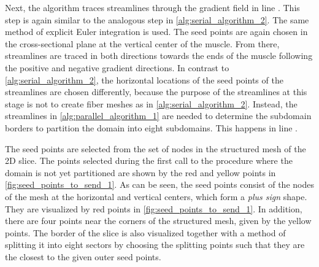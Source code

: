 Next, the algorithm traces streamlines through the gradient field in line . This step is again similar to the analogous step in \cref{alg:serial_algorithm_2}. 
The same method of explicit Euler integration is used. 
The seed points are again chosen in the cross-sectional plane at the vertical center of the muscle. 
From there, streamlines are traced in both directions towards the ends of the muscle following the positive and negative gradient directions. In contrast to \cref{alg:serial_algorithm_2}, the horizontal locations of the seed points of the streamlines are chosen differently, because the purpose of the streamlines at this stage is not to create fiber meshes as in \cref{alg:serial_algorithm_2}.
Instead, the streamlines in \cref{alg:parallel_algorithm_1} are needed to determine the subdomain borders to partition the domain into eight subdomains. This happens in line .

The seed points are selected from the set of nodes in the structured mesh of the 2D slice. The points selected during the first call to the procedure where the domain is not yet partitioned are shown by the red and yellow points in \cref{fig:seed_points_to_send_1}.
As can be seen, the seed points consist of the nodes of the mesh at the horizontal and vertical centers, which form a \emph{plus sign} shape. They are visualized by red points in \cref{fig:seed_points_to_send_1}.
In addition, there are four points near the corners of the structured mesh, given by the yellow points.
The border of the slice is also visualized together with a method of splitting it into eight sectors by choosing the splitting points such that they are the closest to the given outer seed points.

